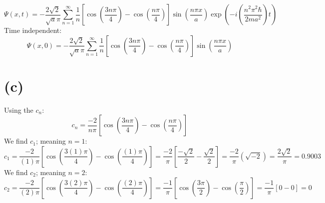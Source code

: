 \documentclass[11pt]{article}
\begin{document}
\[\Psi(x,t)=-\frac{2\sqrt{2}}{\sqrt{a}\pi}
\sum^{\infty}_{n=1}
\frac{1}{n}\left[\cos{\left(\frac{3n\pi}{4}\right)}-\cos{\left(\frac{n\pi}{4}\right)} \right]
\sin{(\frac{n\pi x}{a})}\exp{\left(-i(\frac{n^2\pi^2\hbar}{2ma^2})t\right)}\]
Time independent:
\[\Psi(x,0)=-\frac{2\sqrt{2}}{\sqrt{a}\pi}
\sum^{\infty}_{n=1}
\frac{1}{n}\left[\cos{\left(\frac{3n\pi}{4}\right)}-\cos{\left(\frac{n\pi}{4}\right)} \right]
\sin{(\frac{n\pi x}{a})}\]
\section*{(c)}
Using the $c_n$:
\[c_n=\frac{-2}{n\pi}\left[ \cos{\left(\frac{3n\pi}{4}\right)}-\cos{\left(\frac{n\pi}{4}\right)}\right]\]
We find $c_1$; meaning $n=1$:
\[c_1=\frac{-2}{(1)\pi}\left[ \cos{\left(\frac{3(1)\pi}{4}\right)}-\cos{\left(\frac{(1)\pi}{4}\right)}\right]=\frac{-2}{\pi}\left[ \frac{-\sqrt{2}}{2}-\frac{\sqrt{2}}{2}\right]=\frac{-2}{\pi}(\sqrt{-2})=\frac{2\sqrt{2}}{\pi}=0.9003\]
We find $c_2$; meaning $n=2$:
\[c_2=\frac{-2}{(2)\pi}\left[ \cos{\left(\frac{3(2)\pi}{4}\right)}-\cos{\left(\frac{(2)\pi}{4}\right)}\right]=
\frac{-1}{\pi}\left[ \cos{\left(\frac{3\pi}{2}\right)}-\cos{\left(\frac{\pi}{2}\right)}\right]
=\frac{-1}{\pi}\left[ 0 - 0\right]=0\]
\end{document}
